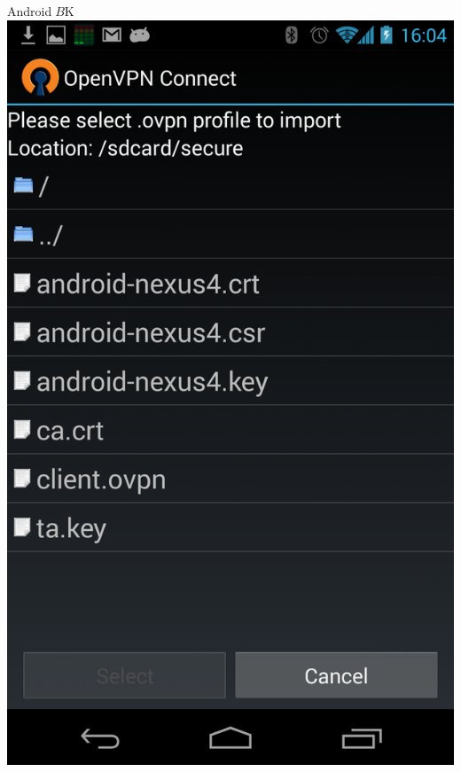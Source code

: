 {{{\begin{frame}
{\end{frame}
\begin{frame}{Android$B$K%
\includegraphics[height=0.9\vsize,bb=0 0 768 1280]{image201308/Screenshot_2013-08-17-16-04-43.png}

}
\end{frame}}}}
